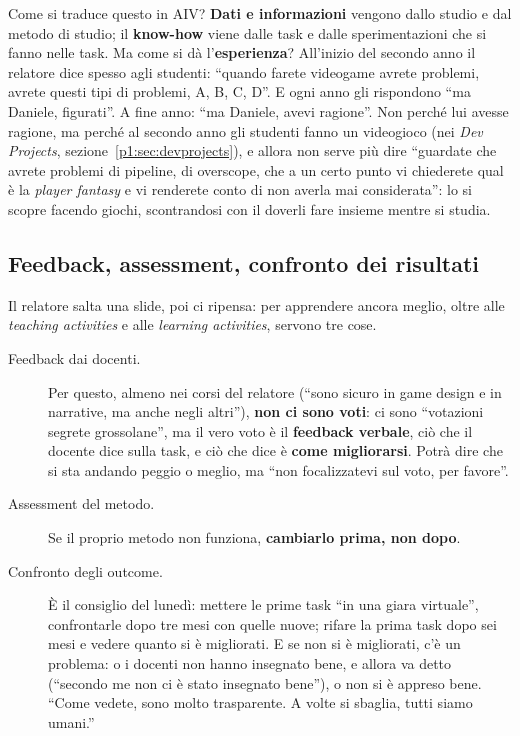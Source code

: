 Come si traduce questo in AIV? \textbf{Dati e informazioni} vengono dallo
studio e dal metodo di studio; il \textbf{know-how} viene dalle task e dalle
sperimentazioni che si fanno nelle task. Ma come si dà l'\textbf{esperienza}?
All'inizio del secondo anno il relatore dice spesso agli studenti: ``quando
farete videogame avrete problemi, avrete questi tipi di problemi, A, B, C,
D''. E ogni anno gli rispondono ``ma Daniele, figurati''. A fine anno: ``ma
Daniele, avevi ragione''. Non perché lui avesse ragione, ma perché al
secondo anno gli studenti fanno un videogioco (nei \emph{Dev Projects},
sezione~\ref{p1:sec:devprojects}), e allora non serve più dire ``guardate
che avrete problemi di pipeline, di overscope, che a un certo punto vi
chiederete qual è la \emph{player fantasy} e vi renderete conto di non
averla mai considerata'': lo si scopre facendo giochi, scontrandosi con il
doverli fare insieme mentre si studia.

\subsection{Feedback, assessment, confronto dei risultati}

Il relatore salta una slide, poi ci ripensa: per apprendere ancora meglio,
oltre alle \emph{teaching activities} e alle \emph{learning activities},
servono tre cose.
\begin{description}
  \item[Feedback dai docenti.] Per questo, almeno nei corsi del relatore
        (``sono sicuro in game design e in narrative, ma anche negli
        altri''), \textbf{non ci sono voti}: ci sono ``votazioni segrete
        grossolane'', ma il vero voto è il \textbf{feedback verbale}, ciò
        che il docente dice sulla task, e ciò che dice è \textbf{come
        migliorarsi}. Potrà dire che si sta andando peggio o meglio, ma
        ``non focalizzatevi sul voto, per favore''.
  \item[Assessment del metodo.] Se il proprio metodo non funziona,
        \textbf{cambiarlo prima, non dopo}.
  \item[Confronto degli outcome.] È il consiglio del lunedì: mettere le
        prime task ``in una giara virtuale'', confrontarle dopo tre mesi
        con quelle nuove; rifare la prima task dopo sei mesi e vedere quanto
        si è migliorati. E se non si è migliorati, c'è un problema: o i
        docenti non hanno insegnato bene, e allora va detto (``secondo me
        non ci è stato insegnato bene''), o non si è appreso bene. ``Come
        vedete, sono molto trasparente. A volte si sbaglia, tutti siamo
        umani.''
\end{description}

